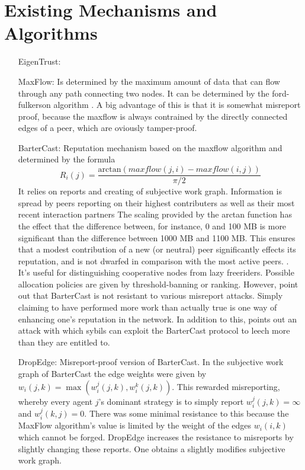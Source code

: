 \documentclass[11pt,a4paper]{report}
\theoremstyle{definition}
\theoremstyle{theorem}
\theoremstyle{proposition}
\theoremstyle{corollary}
\theoremstyle{lemma}
\theoremstyle{example}
\theoremstyle{remark}
\begin{document}
\section{Existing Mechanisms and Algorithms}
\label{sec:Existing Mechanisms and Algorithms}
\begin{enumerate}
\item[EigenTrust:]
\item[MaxFlow:] Is determined by the maximum amount of data that can flow through any path connecting two nodes. It can be determined by the ford-fulkerson algorithm \cite{Bartercast: A Practical Approach to Prevent Lazy Freeriding in P2P Networks}. A big advantage of this is that it is somewhat misreport proof, because the maxflow is always contrained by the directly connected edges of a peer, which are oviously tamper-proof. 
\item[BarterCast:]Reputation mechanism based on the maxflow algorithm and determined by the formula 
\begin{equation}
R_i(j)=\frac{\textrm{arctan}(maxflow(j,i)-maxflow(i,j))}{\pi/2}
\end{equation}
It relies on reports and creating of subjective work graph. Information is spread by peers reporting on their highest contributers as well as their most recent interaction partners
The scaling provided by the arctan function has the effect that the difference between, for instance, 0 and 100 MB is more significant than the difference between 1000 MB and 1100 MB. This ensures that a modest contribution of a new (or neutral) peer significantly effects its reputation, and is not dwarfed in comparison with the most active peers. \cite{Bartercast: A Practical Approach to Prevent Lazy Freeriding in P2P Networks}. It's useful for distinguishing cooperative nodes from lazy freeriders. Possible allocation policies are given by threshold-banning or ranking. However, \cite{Accounting Mechanisms for Distributed Work Systems} point out that BarterCast is not resistant to various misreport attacks. Simply claiming to have performed more work than actually true is one way of enhancing one's reputation in the network. In addition to this, \cite{Sybil-resistant Trust Mechanisms in Distributed Systems} points out an attack with which sybils can exploit the BarterCast protocol to leech more than they are entitled to.
\item[DropEdge:] Misreport-proof version of BarterCast. In the subjective work graph of BarterCast the edge weights were given by $w_i(j,k)=\max(w_i^j(j,k), w_i^k(j,k))$. This rewarded misreporting, whereby every agent $j$'s dominant strategy is to simply report $w_i^j(j,k)=\infty$ and $w_i^j(k,j)=0$. There was some minimal resistance to this because the MaxFlow algorithm's value is limited by the weight of the edges $w_i(i,k)$ which cannot be forged. DropEdge increases the resistance to misreports by slightly changing these reports. One obtains a slightly modifies subjective work graph.

\end{enumerate}
\end{document}
